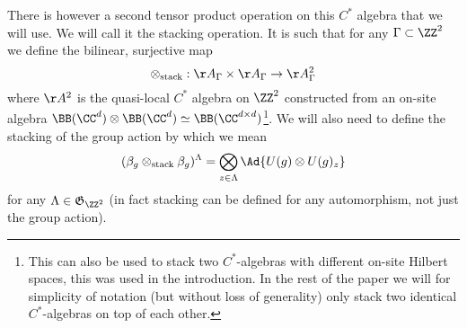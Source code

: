 There is however a second tensor product operation on this $C^*$ algebra that we will use. We will call it the stacking operation. It is such that for any $\Gamma\subset\ZZ^2$ we define the bilinear, surjective map
\begin{equation}
	\otimes_{\text{stack}}:\AA_{\Gamma}\times\AA_{\Gamma}\rightarrow \AA^2_{\Gamma}
\end{equation}
where $\AA^2$ is the quasi-local $C^*$ algebra on $\ZZ^2$ constructed from an on-site algebra $\BB(\CC^d)\otimes\BB(\CC^d)\simeq \BB(\CC^{d\times d})$\footnote{This can also be used to stack two $C^*$-algebras with different on-site Hilbert spaces, this was used in the introduction. In the rest of the paper we will for simplicity of notation (but without loss of generality) only stack two identical $C^*$-algebras on top of each other.}. We will also need to define the stacking of the group action by which we mean
\begin{equation}
	(\beta_g\otimes_{\text{stack}}\beta_g)^\Lambda=\bigotimes_{z\in\Lambda}\Ad{U(g)\otimes U(g)_z}
\end{equation}
for any $\Lambda\in\mathfrak{G}_{\ZZ^2}$ (in fact stacking can be defined for any automorphism, not just the group action).
